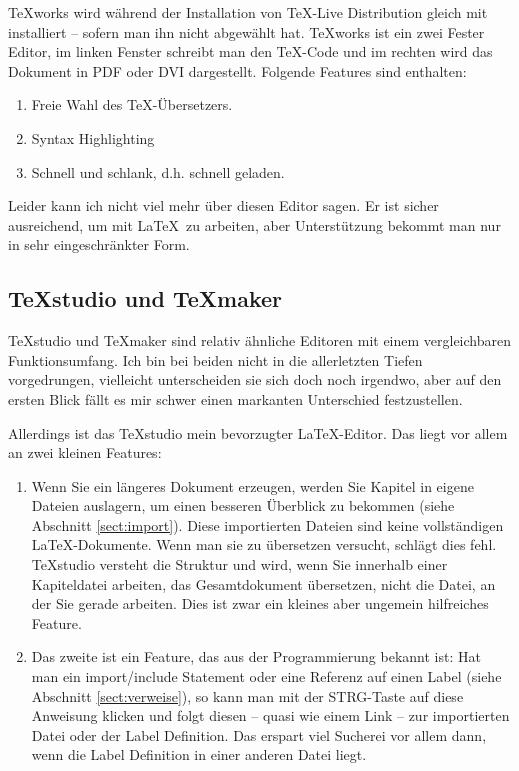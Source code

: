 TeXworks wird während der Installation von \TeX-Live Distribution gleich mit installiert -- sofern man ihn nicht abgewählt hat. TeXworks ist ein zwei Fester Editor, im linken Fenster schreibt man den \TeX-Code und im rechten wird das Dokument in PDF oder DVI dargestellt. Folgende Features sind enthalten:

\begin{enumerate}
\item Freie Wahl des \TeX-Übersetzers. 
\item Syntax Highlighting
\item Schnell und schlank, d.h. schnell geladen.
\end{enumerate}

Leider kann ich nicht viel mehr über diesen Editor sagen. Er ist sicher ausreichend, um mit \LaTeX\ zu arbeiten, aber Unterstützung bekommt man nur in sehr eingeschränkter Form.

\subsection{TeXstudio und TeXmaker}

TeXstudio und TeXmaker sind relativ ähnliche Editoren mit einem vergleichbaren Funktionsumfang. Ich bin bei beiden nicht in die allerletzten Tiefen vorgedrungen, vielleicht unterscheiden sie sich doch noch irgendwo, aber auf den ersten Blick fällt es mir schwer einen markanten Unterschied festzustellen. 

Allerdings ist das TeXstudio mein bevorzugter \LaTeX-Editor. Das liegt vor allem an zwei kleinen Features: 

\begin{enumerate}
\item Wenn Sie ein längeres Dokument erzeugen, werden Sie Kapitel in eigene Dateien auslagern, um einen besseren Überblick zu bekommen (siehe Abschnitt \ref{sect:import}). Diese importierten Dateien sind keine vollständigen \LaTeX-Dokumente. Wenn man sie zu übersetzen versucht, schlägt dies fehl. TeXstudio versteht die Struktur und wird, wenn Sie innerhalb einer Kapiteldatei arbeiten, das Gesamtdokument übersetzen, nicht die Datei, an der Sie gerade arbeiten. Dies ist zwar ein kleines aber ungemein hilfreiches Feature. 
\item Das zweite ist ein Feature, das aus der Programmierung bekannt ist: Hat man ein import/include Statement oder eine Referenz auf einen Label (siehe Abschnitt \ref{sect:verweise}), so kann man mit der STRG-Taste auf diese Anweisung klicken und folgt diesen -- quasi wie einem Link -- zur importierten Datei oder der Label Definition. Das erspart viel Sucherei vor allem dann, wenn die Label Definition in einer anderen Datei liegt. 
\end{enumerate}

